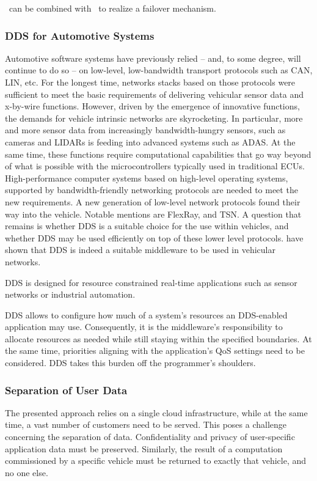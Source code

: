 \ownership\ can be combined with \liveliness\ to realize a failover mechanism.


\subsubsection{DDS for Automotive Systems}
Automotive software systems have previously relied -- and, to some degree, will continue to do so -- on low-level, low-bandwidth transport protocols such as CAN, LIN, etc. For the longest time, networks stacks based on those protocols were sufficient to meet the basic requirements of delivering vehicular sensor data and x-by-wire functions. However, driven by the emergence of innovative functions, the demands for vehicle intrinsic networks are skyrocketing. In particular, more and more sensor data from increasingly bandwidth-hungry sensors, such as cameras and LIDARs is feeding into advanced systems such as ADAS. At the same time, these functions require computational capabilities that go way beyond of what is possible with the microcontrollers typically used in traditional ECUs. High-performance computer systems based on high-level operating systems, supported by bandwidth-friendly networking protocols are needed to meet the new requirements. A new generation of low-level network protocols found their way into the vehicle. Notable mentions are FlexRay, and TSN. A question that remains is whether DDS is a suitable choice for the use within vehicles, and whether DDS may be used efficiently on top of these lower level protocols. \citeauthor*{bouhouch2013dds} have shown \cite{bouhouch2013dds} that DDS is indeed a suitable middleware to be used in vehicular networks.


DDS is designed for resource constrained real-time applications such as sensor networks or industrial automation.

DDS allows to configure how much of a system's resources an DDS-enabled application may use. Consequently, it is the middleware's responsibility to allocate resources as needed while still staying within the specified boundaries. At the same time, priorities aligning with the application's QoS settings need to be considered. DDS takes this burden off the programmer's shoulders.



\subsubsection{Separation of User Data}
The presented approach relies on a single cloud infrastructure, while at the same time, a vast number of customers need to be served. This poses a challenge concerning the separation of data. Confidentiality and privacy of user-specific application data must be preserved. Similarly, the result of a computation commissioned by a specific vehicle must be returned to exactly that vehicle, and no one else. 

